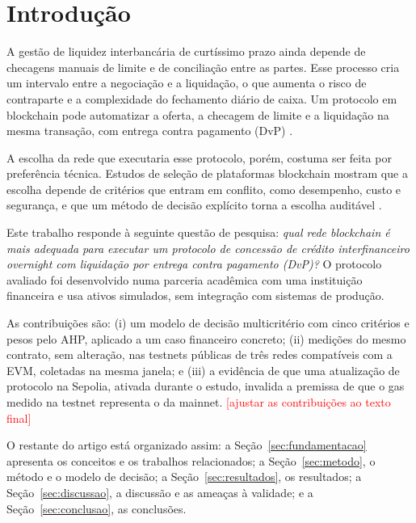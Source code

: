 \documentclass[10pt,a4paper]{article}
\newcommand{\pendente}[1]{\textcolor{red}{[#1]}}
\begin{document}
\section{Introdução}

A gestão de liquidez interbancária de curtíssimo prazo ainda depende de checagens manuais de limite e de conciliação entre as partes. Esse processo cria um intervalo entre a negociação e a liquidação, o que aumenta o risco de contraparte e a complexidade do fechamento diário de caixa. Um protocolo em blockchain pode automatizar a oferta, a checagem de limite e a liquidação na mesma transação, com entrega contra pagamento (DvP) \cite{bis1992dvp,cpss2012pfmi}.

A escolha da rede que executaria esse protocolo, porém, costuma ser feita por preferência técnica. Estudos de seleção de plataformas blockchain mostram que a escolha depende de critérios que entram em conflito, como desempenho, custo e segurança, e que um método de decisão explícito torna a escolha auditável \cite{farshidi2020,baninemeh2023,six2020}.

Este trabalho responde à seguinte questão de pesquisa: \emph{qual rede blockchain é mais adequada para executar um protocolo de concessão de crédito interfinanceiro overnight com liquidação por entrega contra pagamento (DvP)?} O protocolo avaliado foi desenvolvido numa parceria acadêmica com uma instituição financeira e usa ativos simulados, sem integração com sistemas de produção.

As contribuições são: (i) um modelo de decisão multicritério com cinco critérios e pesos pelo AHP, aplicado a um caso financeiro concreto; (ii) medições do mesmo contrato, sem alteração, nas testnets públicas de três redes compatíveis com a EVM, coletadas na mesma janela; e (iii) a evidência de que uma atualização de protocolo na Sepolia, ativada durante o estudo, invalida a premissa de que o gas medido na testnet representa o da mainnet. \pendente{ajustar as contribuições ao texto final}

O restante do artigo está organizado assim: a Seção~\ref{sec:fundamentacao} apresenta os conceitos e os trabalhos relacionados; a Seção~\ref{sec:metodo}, o método e o modelo de decisão; a Seção~\ref{sec:resultados}, os resultados; a Seção~\ref{sec:discussao}, a discussão e as ameaças à validade; e a Seção~\ref{sec:conclusao}, as conclusões.

\end{document}
